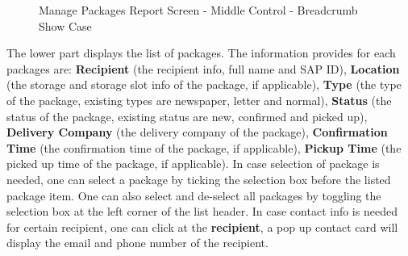 \begin{figure}[H]
	\centering
	\hspace{5pt}

	\caption{Manage Packages Report Screen - Middle Control - Breadcrumb Show Case}
	\label{fig:MPBreadCrumb}
\end{figure}

The lower part displays the list of packages. The information provides for each packages are: \textbf{Recipient} (the recipient info, full name and SAP ID), \textbf{Location} (the storage and storage slot info of the package, if applicable), \textbf{Type} (the type of the package, existing types are newspaper, letter and normal), \textbf{Status} (the status of the package, existing status are new, confirmed and picked up), \textbf{Delivery Company} (the delivery company of the package), \textbf{Confirmation Time} (the confirmation time of the package, if applicable), \textbf{Pickup Time} (the picked up time of the package, if applicable).
In case selection of package is needed, one can select a package by ticking the selection box before the listed package item. One can also select and de-select all packages by toggling the selection box at the left corner of the list header.
In case contact info is needed for certain recipient, one can click at the \textbf{recipient}, a pop up contact card will display the email and phone number of the recipient.

